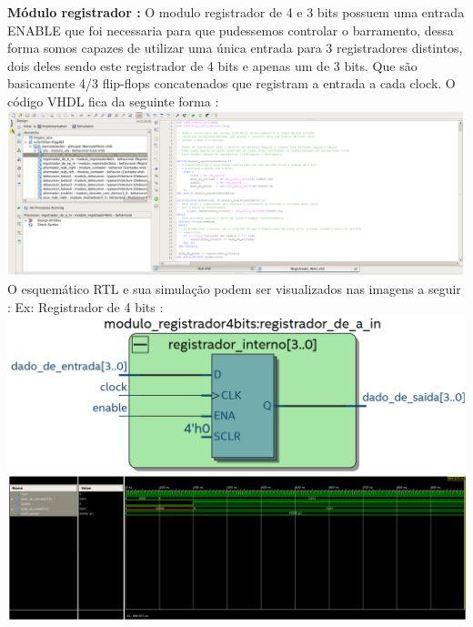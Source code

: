 \documentclass[11pt]{book}
\begin{document}
\newpage \textbf{Módulo registrador :} 
\newline\newline
O modulo registrador de 4 e 3 bits possuem uma entrada ENABLE que foi necessaria para que pudessemos controlar o barramento, dessa forma somos capazes de utilizar uma única entrada para 3 registradores distintos, dois deles sendo este registrador de 4 bits e apenas um de 3 bits. Que são basicamente 4/3 flip-flops concatenados que registram a entrada a cada clock. 
O código VHDL fica da seguinte forma :
\newline\newline
\includegraphics[width=1.1\textwidth]{codigo_registradorA.png}%
\newline
O esquemático RTL e sua simulação podem ser visualizados nas imagens a seguir :
\newline
Ex: Registrador de 4 bits :
\newline
\includegraphics[width=1.1\textwidth]{RTL_registradorA.png}%
\newline\newline
\includegraphics[width=1.1\textwidth]{simulacao_registrador.png}%
\newline
\end{document}
